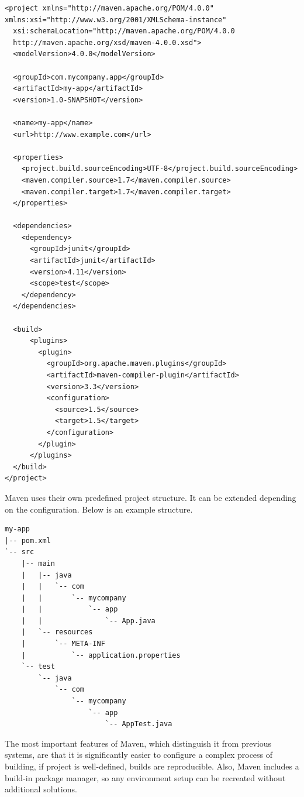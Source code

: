 \begin{lstlisting}[frame=single, caption={%
  Example of simple pom.xml file \cite{POMFILE}%
}]
<project xmlns="http://maven.apache.org/POM/4.0.0" 
xmlns:xsi="http://www.w3.org/2001/XMLSchema-instance"
  xsi:schemaLocation="http://maven.apache.org/POM/4.0.0
  http://maven.apache.org/xsd/maven-4.0.0.xsd">
  <modelVersion>4.0.0</modelVersion>
 
  <groupId>com.mycompany.app</groupId>
  <artifactId>my-app</artifactId>
  <version>1.0-SNAPSHOT</version>
 
  <name>my-app</name>
  <url>http://www.example.com</url>
 
  <properties>
    <project.build.sourceEncoding>UTF-8</project.build.sourceEncoding>
    <maven.compiler.source>1.7</maven.compiler.source>
    <maven.compiler.target>1.7</maven.compiler.target>
  </properties>
 
  <dependencies>
    <dependency>
      <groupId>junit</groupId>
      <artifactId>junit</artifactId>
      <version>4.11</version>
      <scope>test</scope>
    </dependency>
  </dependencies>
 
  <build>
      <plugins>
        <plugin>
          <groupId>org.apache.maven.plugins</groupId>
          <artifactId>maven-compiler-plugin</artifactId>
          <version>3.3</version>
          <configuration>
            <source>1.5</source>
            <target>1.5</target>
          </configuration>
        </plugin>
      </plugins>
  </build>
</project>
\end{lstlisting}

Maven uses their own predefined project structure. It can be extended
depending on the configuration. Below is an example structure.

\begin{verbatim}
my-app
|-- pom.xml
`-- src
    |-- main
    |   |-- java
    |   |   `-- com
    |   |       `-- mycompany
    |   |           `-- app
    |   |               `-- App.java
    |   `-- resources
    |       `-- META-INF
    |           `-- application.properties
    `-- test
        `-- java
            `-- com
                `-- mycompany
                    `-- app
                        `-- AppTest.java
\end{verbatim}

The most important features of Maven, which distinguish it from previous
systems, are that it is significantly easier to configure a complex
process of building, if project is well-defined, builds are reproducible.
Also, Maven includes a build-in package manager, so any environment setup
can be recreated without additional solutions.

